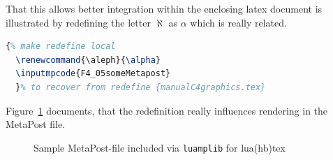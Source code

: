 That this allows better integration within the enclosing latex document 
is illustrated by redefining the letter $\aleph$ as $\alpha$ which is really related. 
%
\begin{lstlisting}[language=TeX]
  {% make redefine local 
  \renewcommand{\aleph}{\alpha}
  \inputmpcode{F4_05someMetapost}
  }% to recover from redefine {manualC4graphics.tex}
\end{lstlisting}

Figure~\ref{fig:metapostLua} documents, 
that the redefinition really influences rendering in the MetaPost file. 

\begin{figure}[htb]
  \centering
  \caption{\label{fig:metapostLua}
  Sample MetaPost-file included via \texttt{luamplib} for lua(hb)tex }
  \end{figure}
  

  
  
  



  








